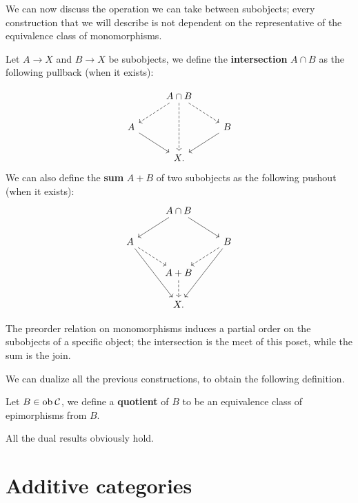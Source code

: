 We can now discuss the operation we can take between subobjects; every construction that we will describe is not dependent on the representative of the equivalence class of monomorphisms.

\begin{definition}
	Let $A \longrightarrow X$ and $B\longrightarrow X$ be subobjects, we define the \textbf{intersection} $A \cap B$ as the following pullback (when it exists):

	\[\begin{tikzcd}
		& {A\cap B} \\
		A && B \\
		& X.
		\arrow[dashed, from=1-2, to=2-1]
		\arrow[dashed, from=1-2, to=2-3]
		\arrow[dashed, from=1-2, to=3-2]
		\arrow[from=2-1, to=3-2]
		\arrow[from=2-3, to=3-2]
	\end{tikzcd}\]
	We can also define the \textbf{sum} $A+B$ of two subobjects as the following pushout (when it exists):
	\[\begin{tikzcd}
		& {A\cap B} \\
		A && B \\
		& {A+B} \\
		& {X.}
		\arrow[from=1-2, to=2-1]
		\arrow[from=1-2, to=2-3]
		\arrow[dashed, from=2-1, to=3-2]
		\arrow[from=2-1, to=4-2]
		\arrow[dashed, from=2-3, to=3-2]
		\arrow[from=2-3, to=4-2]
		\arrow[dashed, from=3-2, to=4-2]
	\end{tikzcd}\]

\end{definition}


\begin{remark}
	The preorder relation on monomorphisms induces a partial order on the subobjects of a specific object; the intersection is the meet of this poset, while the sum is the join.
\end{remark}

We can dualize all the previous constructions, to obtain the following definition.

\begin{definition}[Quotient]
	Let $B \in \mathrm{ob} \: \mathcal{C}$, we define a \textbf{quotient} of $B$ to be an equivalence class of epimorphisms from $B$.
\end{definition}

All the dual results obviously hold.

\section{Additive categories}

